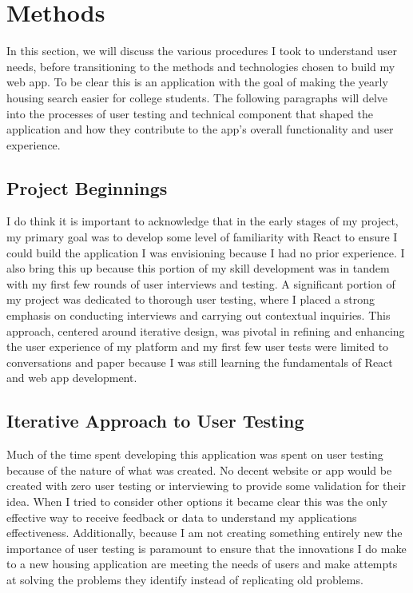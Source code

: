 \documentclass[10pt,twocolumn]{article}
\begin{document}
\section{Methods}
In this section, we will discuss the various procedures I took to understand user needs, before transitioning to the methods and technologies chosen to build my web app. To be clear this is an application with the goal of making the yearly housing search easier for college students. The following paragraphs will delve into the processes of user testing and technical component that shaped the application and how they contribute to the app's overall functionality and user experience.

\subsection{Project Beginnings}
I do think it is important to acknowledge that in the early stages of my project, my primary goal was to develop some level of familiarity with React to ensure I could build the application I was envisioning because I had no prior experience. I also bring this up because this portion of my skill development was in tandem with my first few rounds of user interviews and testing. A significant portion of my project was dedicated to thorough user testing, where I placed a strong emphasis on conducting interviews and carrying out contextual inquiries. This approach, centered around iterative design, was pivotal in refining and enhancing the user experience of my platform and my first few user tests were limited to conversations and paper because I was still learning the fundamentals of React and web app development. 

\subsection{Iterative Approach to User Testing}
Much of the time spent developing this application was spent on user testing because of the nature of what was created. No decent website or app would be created with zero user testing or interviewing to provide some validation for their idea. When I tried to consider other options it became clear this was the only effective way to receive feedback or data to understand my applications effectiveness. Additionally, because I am not creating something entirely new the importance of user testing is paramount to ensure that the innovations I do make to a new housing application are meeting the needs of users and make attempts at solving the problems they identify instead of replicating old problems. 
\end{document}
